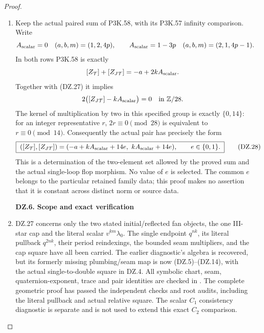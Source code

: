 \begin{proof}
\begin{enumerate}[label=\arabic*.]
\par

\medskip\noindent\textbf{DZ.5. The paired returns with their exact remaining ambiguity}

\par\nobreak

\item Keep the actual paired sum of P3K.58, with its P3K.57 infinity
comparison. Write
\[
 A_{\rm scalar}=0\quad(a,b,m)=(1,2,4p),\qquad
 A_{\rm scalar}=1-3p\quad(a,b,m)=(2,1,4p-1).
\]
In both rows P3K.58 is exactly
\[
       [Z_{\mathcal T}]+[Z_{J\mathcal T}]
                          =-a+2kA_{\rm scalar}.
\]
Together with (DZ.27) it implies
\[
             2\bigl([Z_{J\mathcal T}]-kA_{\rm scalar}\bigr)=0
                              \quad\text{in }\mathbb Z/28.
\]
The kernel of multiplication by two in this specified group is
exactly \(\{0,14\}\): for an integer representative \(r\),
\(2r\equiv0\pmod{28}\) is equivalent to \(r\equiv0\pmod{14}\).
Consequently the actual pair has precisely the form
\[
 \boxed{\;
 ([Z_{\mathcal T}],[Z_{J\mathcal T}])
   =(-a+kA_{\rm scalar}+14e,\ kA_{\rm scalar}+14e),
       \qquad e\in\{0,1\}.\;}                       \tag{DZ.28}
\]
This is a determination of the two-element set allowed by the
proved sum and the actual single-loop flop morphism. No value of
\(e\) is selected. The common \(e\) belongs to the particular
retained family data; this proof makes no assertion that it is
constant across distinct norm or source data.

\par

\medskip\noindent\textbf{DZ.6. Scope and exact verification}

\par\nobreak

\item DZ.27 concerns only the two stated initial/reflected fan objects,
the one III-star cap and the literal scalar \(v^{km}\lambda_0\).
The single endpoint \(q^{nk}\), its literal pullback
\(q^{2nk}\), their period reindexings, the bounded seam
multipliers, and the cap square have all been carried.
The earlier diagnostic's algebra is recovered, but its formerly
missing plumbing/seam map is now (DZ.5)--(DZ.14), with the actual
single-to-double square in DZ.4.
All symbolic chart, seam, quaternion-exponent, trace and pair
identities are checked in
.
The complete geometric proof has passed the independent checks and
root audits, including the literal pullback and actual relative square.
The scalar \(C_1\) consistency diagnostic
is separate and is not used to extend this exact \(C_2\) comparison.

\end{enumerate}
\end{proof}